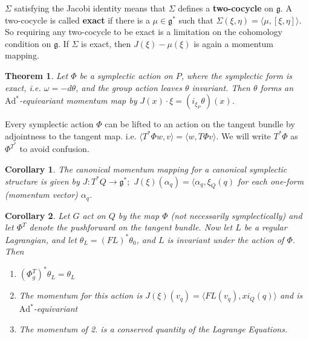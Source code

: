 \documentclass{article}
\newtheorem{thm}{Theorem}
\newtheorem{cor}{Corollary}
\begin{document}
\indent $\Sigma$ satisfying the Jacobi identity means that $\Sigma$ defines a \textbf{two-cocycle} on $\mathfrak{g}$. A two-cocycle is called \textbf{exact} if there is a $\mu \in \mathfrak{g}^*$ such that $\Sigma(\xi, \eta) = \langle \mu, [\xi, \eta] \rangle$. So requiring any two-cocycle to be exact is a limitation on the cohomology condition on $\mathfrak{g}$. If $\Sigma$ is exact, then $J(\xi) - \mu(\xi)$ is again a momentum mapping. 

\begin{thm}

Let $\Phi$ be a symplectic action on $P$, where the symplectic form is exact, i.e. $\omega = - d\theta$, and the group action leaves $\theta$ invariant. Then $\theta$ forms an $\mathrm{Ad}^*$-equivariant momentum map by $J(x) \cdot \xi = (i_{\xi_P} \theta)(x)$.

\end{thm}

Every symplectic action $\Phi$ can be lifted to an action on the tangent bundle by adjointness to the tangent map. i.e. $\langle T^* \Phi w, v \rangle = \langle w, T\Phi v \rangle$. We will write $T^*\Phi$ as $\Phi^{T^*}$ to avoid confusion.

\begin{cor}

The canonical momentum mapping for a canonical symplectic structure is given by $J: T^*Q \to \mathfrak{g}^*; \hspace{4pt} J(\xi)(\alpha_q) = \langle \alpha_q, \xi_Q(q) $ for each one-form (momentum vector) $\alpha_q$.
\end{cor}

\begin{cor}

Let $G$ act on $Q$ by the map $\Phi$ (not necessarily symplectically) and let $\Phi^T$ denote the pushforward on the tangent bundle. Now let $L$ be a regular Lagrangian, and let $\theta_L = (FL)^*\theta_0$, and $L$ is invariant under the action of $\Phi$. Then

\begin{enumerate}
    \item $(\Phi^T_g)^* \theta_L = \theta_L $
    \item The momentum for this action is $J(\xi)(v_q) = \langle FL(v_q), xi_Q(q) \rangle$ and is $\mathrm{Ad}^*$-equivariant
    \item The momentum of 2. is a conserved quantity of the Lagrange Equations.
    
\end{enumerate}

\end{cor}
\end{document}
